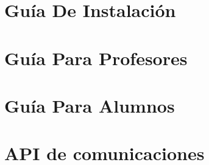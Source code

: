 \documentclass[a4paper, 12pt]{book}
\begin{document}

\cleardoublepage
\appendix

\chapter{Guía De Instalación}
\label{app:guia_instalacion}



\chapter{Guía Para Profesores}
\label{app:guia_profesores}



\chapter{Guía Para Alumnos}
\label{app:guia_alumnos}



\chapter{API de comunicaciones}
\label{app:api}
\end{document}
